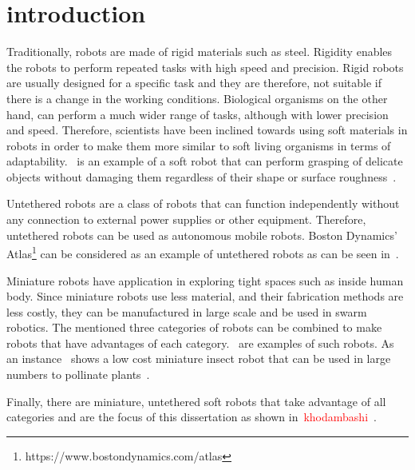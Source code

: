 \graphicspath{{Images/intro/}}
\chapter{introduction}
\label{chap:intro}

Traditionally, robots are made of rigid materials such as steel. Rigidity enables the robots to perform repeated tasks with high speed and precision. Rigid robots are usually designed for a specific task and they are therefore, not suitable if there is a change in the working conditions. Biological organisms on the other hand, can perform a much wider range of tasks, although with lower precision and speed. Therefore, scientists have been inclined towards using soft materials in robots in order to make them more similar to soft living organisms in terms of adaptability.~ is an example of a soft robot that can perform grasping of delicate objects without damaging them regardless of their shape or surface roughness~\cite{Li2019}.

Untethered robots are a class of robots that can function independently without any connection to external power supplies or other equipment. Therefore, untethered robots can be used as autonomous mobile robots. Boston Dynamics' Atlas\footnote{https://www.bostondynamics.com/atlas\label{fn:boston}} can be considered as an example of untethered robots as can be seen in~. 

Miniature robots have application in exploring tight spaces such as inside human body. Since miniature robots use less material, and their fabrication methods are less costly, they can be manufactured in large scale and be used in swarm robotics. The mentioned three categories of robots can be combined to make robots that have advantages of each category.~ are examples of such robots. As an instance~ shows a low cost miniature insect robot that can be used in large numbers to pollinate plants~\cite{Jafferis2019}. 

Finally, there are miniature, untethered soft robots that take advantage of all categories and are the focus of this dissertation as shown in~\textcolor{red}{khodambashi~\cite{}}.
 
